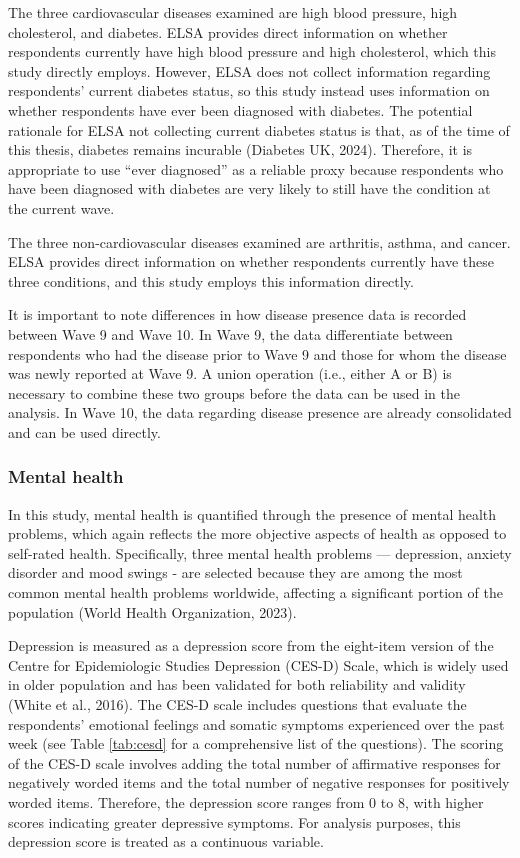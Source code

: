 The three cardiovascular diseases examined are high blood pressure, high cholesterol, and diabetes. ELSA provides direct information on whether respondents currently have high blood pressure and high cholesterol, which this study directly employs. However, ELSA does not collect information regarding respondents' current diabetes status, so this study instead uses information on whether respondents have ever been diagnosed with diabetes. The potential rationale for ELSA not collecting current diabetes status is that, as of the time of this thesis, diabetes remains incurable (Diabetes UK, 2024). Therefore, it is appropriate to use ``ever diagnosed” as a reliable proxy because respondents who have been diagnosed with diabetes are very likely to still have the condition at the current wave.

The three non-cardiovascular diseases examined are arthritis, asthma, and cancer. ELSA provides direct information on whether respondents currently have these three conditions, and this study employs this information directly.

It is important to note differences in how disease presence data is recorded between Wave 9 and Wave 10. In Wave 9, the data differentiate between respondents who had the disease prior to Wave 9 and those for whom the disease was newly reported at Wave 9. A union operation (i.e., either A or B) is necessary to combine these two groups before the data can be used in the analysis. In Wave 10, the data regarding disease presence are already consolidated and can be used directly.

\subsubsection{Mental health}
In this study, mental health is quantified through the presence of mental health problems, which again reflects the more objective aspects of health as opposed to self-rated health. Specifically, three mental health problems — depression, anxiety disorder and mood swings - are selected because they are among the most common mental health problems worldwide, affecting a significant portion of the population (World Health Organization, 2023). 

Depression is measured as a depression score from the eight-item version of the Centre for Epidemiologic Studies Depression (CES-D) Scale, which is widely used in older population and has been validated for both reliability and validity (White et al., 2016). The CES-D scale includes questions that evaluate the respondents’ emotional feelings and somatic symptoms experienced over the past week (see Table \ref{tab:cesd} for a comprehensive list of the questions). The scoring of the CES-D scale involves adding the total number of affirmative responses for negatively worded items and the total number of negative responses for positively worded items. Therefore, the depression score ranges from 0 to 8, with higher scores indicating greater depressive symptoms. For analysis purposes, this depression score is treated as a continuous variable.

